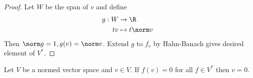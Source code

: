 \documentclass[a4paper]{article}
\begin{document}
\begin{proof}
  Let \(W\) be the span of \(v\) and define
  \begin{align*}
    g: W &\to \R \\
    tv &\mapsto t \norm v
  \end{align*}
  Then \(\norm g = 1, g(v) = \norm v\). Extend \(g\) to \(f_v\) by Hahn-Banach gives desired element of \(V^*\).
\end{proof}

\begin{corollary}
  Let \(V\) be a normed vector space and \(v \in V\). If \(f(v) = 0\) for all \(f \in V^*\) then \(v = 0\).
\end{corollary}


\printindex
\end{document}
